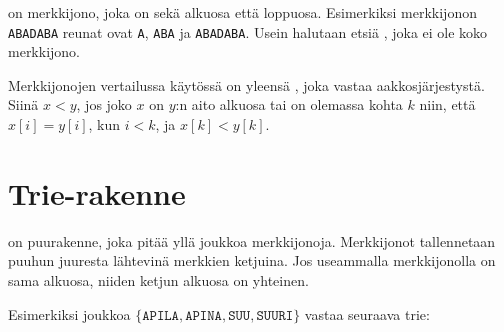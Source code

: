  on
merkkijono, joka on sekä
alkuosa että loppuosa.
Esimerkiksi merkkijonon \texttt{ABADABA}
reunat ovat \texttt{A}, \texttt{ABA} ja
\texttt{ABADABA}.
Usein halutaan etsiä ,
joka ei ole koko merkkijono.


Merkkijonojen vertailussa käytössä on yleensä
, joka vastaa aakkosjärjestystä.
Siinä $x<y$, jos joko $x$ on $y$:n aito alkuosa
tai on olemassa kohta $k$ niin,
että $x[i]=y[i]$, kun $i<k$, ja $x[k]<y[k]$.

\section{Trie-rakenne}


 on puurakenne,
joka pitää yllä joukkoa merkkijonoja.
Merkkijonot tallennetaan puuhun
juuresta lähtevinä merkkien ketjuina.
Jos useammalla merkkijonolla on sama alkuosa,
niiden ketjun alkuosa on yhteinen.

Esimerkiksi joukkoa
$\{\texttt{APILA},\texttt{APINA},\texttt{SUU},\texttt{SUURI}\}$
vastaa seuraava trie:

